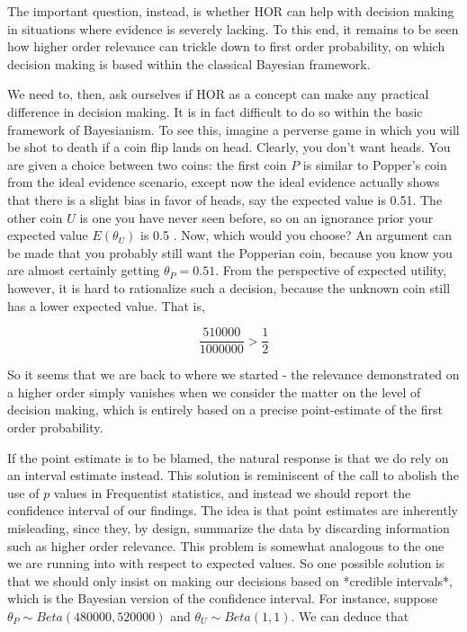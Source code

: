 The important question, instead, is whether HOR can help with decision
making in situations where evidence is severely lacking. To this end, it
remains to be seen how higher order relevance can trickle down to first
order probability, on which decision making is based within the
classical Bayesian framework.

We need to, then, ask ourselves if HOR as a concept can make any
practical difference in decision making. It is in fact difficult to do
so within the basic framework of Bayesianism. To see this, imagine a
perverse game in which you will be shot to death if a coin flip lands on
head. Clearly, you don't want heads. You are given a choice between two
coins: the first coin \(P\) is similar to Popper's coin from the ideal
evidence scenario, except now the ideal evidence actually shows that
there is a slight bias in favor of heads, say the expected value is
0.51. The other coin \(U\) is one you have never seen before, so on an
ignorance prior your expected value \(E(\theta_U)\) is 0.5 . Now, which
would you choose? An argument can be made that you probably still want
the Popperian coin, because you know you are almost certainly getting
\(\theta_P = 0.51\). From the perspective of expected utility, however,
it is hard to rationalize such a decision, because the unknown coin
still has a lower expected value. That is,

\[\frac{510000}{1000000}> \frac{1}{2}\]

So it seems that we are back to where we started - the relevance
demonstrated on a higher order simply vanishes when we consider the
matter on the level of decision making, which is entirely based on a
precise point-estimate of the first order probability.

If the point estimate is to be blamed, the natural response is that we
do rely on an interval estimate instead. This solution is reminiscent of
the call to abolish the use of \(p\) values in Frequentist statistics,
and instead we should report the confidence interval of our findings.
The idea is that point estimates are inherently misleading, since they,
by design, summarize the data by discarding information such as higher
order relevance. This problem is somewhat analogous to the one we are
running into with respect to expected values. So one possible solution
is that we should only insist on making our decisions based on *credible
intervals*, which is the Bayesian version of the confidence interval.
For instance, suppose \(\theta_P \sim Beta(480000,520000)\) and
\(\theta_U \sim Beta(1,1)\). We can deduce that

